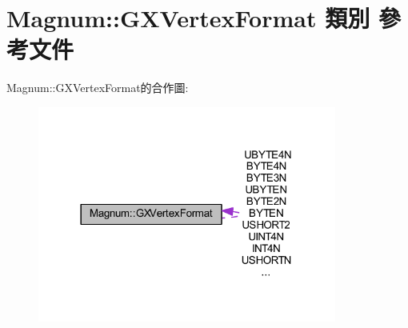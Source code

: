 \hypertarget{class_magnum_1_1_g_x_vertex_format}{}\section{Magnum\+:\+:G\+X\+Vertex\+Format 類別 參考文件}
\label{class_magnum_1_1_g_x_vertex_format}


Magnum\+:\+:G\+X\+Vertex\+Format的合作圖\+:\nopagebreak
\begin{figure}[H]
\begin{center}
\leavevmode
\includegraphics[width=278pt]{class_magnum_1_1_g_x_vertex_format__coll__graph}
\end{center}
\end{figure}
